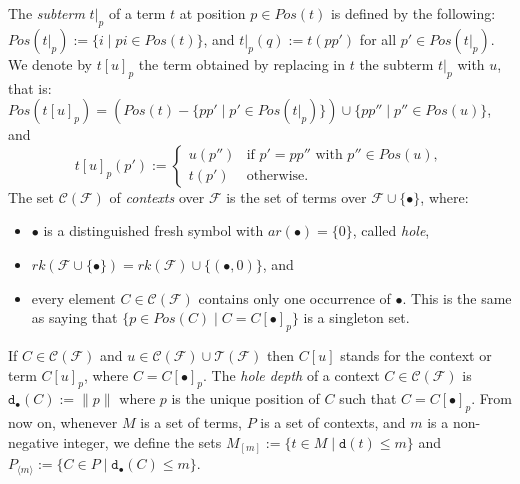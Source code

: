\documentclass[preprint,12pt,english]{article}
\def\hole{\bullet}
\def\cC{\mathcal{C}}
\def\cF{\mathcal{F}}
\def\cT{\mathcal{T}}
\def\depth{\mathtt{d}}
\newcommand\pair[1]{\langle{#1}\rangle}
\begin{document}
The {\em subterm} $t|_p$ of a term $t$ at position $p\in Pos(t)$ is defined by the following: $Pos(t|_p):=\{i\mid pi\in Pos(t)\}$, and $t|_p(q):=t(pp')$ for all $p'\in Pos(t|_p).$ 
We denote by $t[u]_p$ the term obtained by replacing in $t$ the subterm $t|_p$ with $u$, that is: $Pos(t[u]_p)=(Pos(t)-\{pp'\mid p'\in Pos(t|_p)\})\cup\{pp''\mid p''\in Pos(u)\}$, and $$t[u]_p(p'):=\left\{\begin{array}{ll}
u(p'')&\mbox{if }p'=pp''\text{ with }p''\in Pos(u),\\
t(p')&\mbox{otherwise.}
\end{array}\right.$$
The set $\cC(\cF)$ of {\em contexts} over $\cF$ is the set of terms  over $\cF\cup\{\bullet\}$, where:
\begin{itemize}
\item $\bullet$ is a distinguished fresh symbol with $ar(\hole)=\{0\}$, called {\em hole},
\item $rk(\cF\cup\{\bullet\})=rk(\cF)\cup\{(\bullet,0)\}$, and 
\item every element $C\in\cC(\cF)$ contains only one occurrence of $\bullet$. This is the same as saying that $\{p\in Pos(C)\mid C=C[\bullet]_p\}$ is a singleton set. 
\end{itemize}
If $C\in\cC(\cF)$ and $u\in\cC(\cF)\cup\cT(\cF)$ then $C[u]$ stands for the context or term $C[u]_p$, where $C=C[\bullet]_p.$ The {\em hole depth} of a context $C\in\cC(\cF)$ is $\depth_\hole(C):=\|p\|$ where $p$ is the unique position of $C$ such that $C=C[\hole]_p.$ 
From now on, whenever $M$ is a set of terms, $P$ is a set of contexts, and $m$ is a non-negative integer, we define the sets
$M_{[m]}:=\{t\in M\mid \depth(t)\leq m\}$ and $P_{\pair{m}}:=\{C\in P\mid \depth_\hole(C)\leq m\}$.
\end{document}
